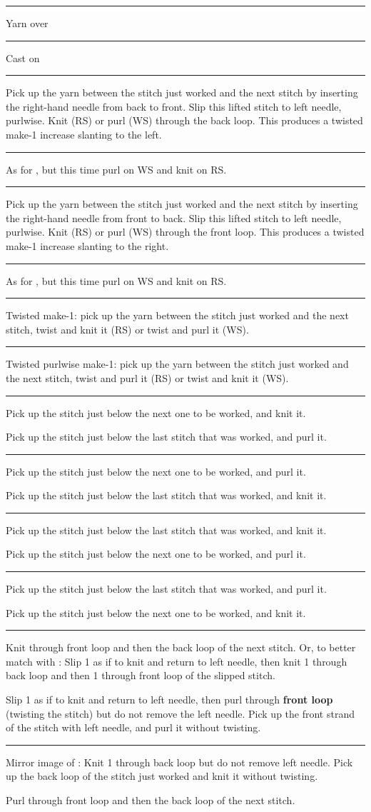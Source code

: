 \documentclass{amsart}
\newlength{\symbolcolwidth}
\newlength{\singlecolwidth}
\newlength{\doublecolwidth}
\newcommand{\setcolwidths}[1]{
	\setlength{\symbolcolwidth}{#1}
	\addtolength{\symbolcolwidth}{1pt}
	\setlength{\doublecolwidth}{\textwidth}
	\addtolength{\doublecolwidth}{-4\tabcolsep}
	\addtolength{\doublecolwidth}{-1.2pt} %
	\addtolength{\doublecolwidth}{-\symbolcolwidth}
	\setlength{\singlecolwidth}{0.5\doublecolwidth}
	\addtolength{\singlecolwidth}{-1\tabcolsep}
	\addtolength{\singlecolwidth}{-0.2pt} %
	}
\newcommand\keyrow[3]{\par\allowbreak\hrule\par\nopagebreak\noindent
	\vrule\hfill 
	\begin{minipage}{\symbolcolwidth}\centering#1\end{minipage}%
	\hfill\vrule\hfill
	\begin{minipage}{\singlecolwidth}
		\raisebox{1pt}{\strut}#2\raisebox{-1pt}{\strut}\end{minipage}%
	\hfill\vrule\hfill
	\begin{minipage}{\singlecolwidth}
		\raisebox{1pt}{\strut}#3\raisebox{-1pt}{\strut}\end{minipage}%
	\hfill\vrule
	\par\nointerlineskip}
\newcommand\dblkeyrow[2]{\par\allowbreak\hrule\par\nopagebreak\noindent
	\vrule\hfill
	\begin{minipage}{\symbolcolwidth}\centering#1\end{minipage}%
	\hfill\vrule\hfill
	\begin{minipage}{\doublecolwidth}
		\raisebox{1pt}{\strut}#2\raisebox{-1pt}{\strut}\end{minipage}%
	\hfill\vrule
	\par\nointerlineskip}
\begin{document}
\begin{fullpages}
\setcolwidths{\stitchwd}
\dblkeyrow{}{Yarn over}
\dblkeyrow{}{Cast on}
\dblkeyrow{}{Pick up the yarn between the stitch just worked and the next stitch by inserting the right-hand needle from back to front. Slip this lifted stitch to left needle, purlwise. Knit (RS) or purl (WS) through the back loop. This produces a twisted make-1 increase slanting to the left.}
\dblkeyrow{}{As for , but this time purl on WS and knit on RS.}
\dblkeyrow{}{Pick up the yarn between the stitch just worked and the next stitch by inserting the right-hand needle from front to back. Slip this lifted stitch to left needle, purlwise. Knit (RS) or purl (WS) through the front loop. This produces a twisted make-1 increase slanting to the right.}
\dblkeyrow{}{As for , but this time purl on WS and knit on RS.}
\dblkeyrow{}{Twisted make-1: pick up the yarn between the stitch just worked and the next stitch, twist and knit it (RS) or twist and purl it (WS).}
\dblkeyrow{}{Twisted purlwise make-1: pick up the yarn between the stitch just worked and the next stitch, twist and purl it (RS) or twist and knit it (WS).}
\keyrow{}{Pick up the stitch just below the next one to be worked, and knit it.}{Pick up the stitch just below the last stitch that was worked, and purl it.}
\keyrow{}{Pick up the stitch just below the next one to be worked, and purl it.}{Pick up the stitch just below the last stitch that was worked, and knit it.}
\keyrow{}{Pick up the stitch just below the last stitch that was worked, and knit it.}{Pick up the stitch just below the next one to be worked, and purl it.}
\keyrow{}{Pick up the stitch just below the last stitch that was worked, and purl it.}{Pick up the stitch just below the next one to be worked, and knit it.}
\keyrow{}{Knit through front loop and then the back loop of the next stitch. Or, to better match with \textknit{u}: Slip 1 as if to knit and return to left needle, then knit 1 through back loop and then 1 through front loop of the slipped stitch.}{Slip 1 as if to knit and return to left needle, then purl through \textbf{front loop} (twisting the stitch) but do not remove the left needle. Pick up the front strand of the stitch with left needle, and purl it without twisting.}
\keyrow{}{Mirror image of : Knit 1 through back loop but do not remove left needle. Pick up the back loop of the stitch just worked and knit it without twisting.}{Purl through front loop and then the back loop of the next stitch.}

\end{fullpages}
\end{document}
